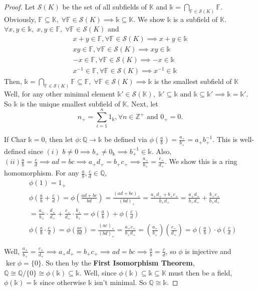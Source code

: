 \documentclass[addpoints,10pt]{exam}
\theoremstyle{plain}
\theoremstyle{definition}
\theoremstyle{plain}
\theoremstyle{plain}
\theoremstyle{definition}
\newcommand{\FF}{\ensuremath{\mathbb{F}}}
\newcommand{\KK}{\ensuremath{\mathbb{K}}}
\newcommand{\QQ}{\ensuremath{\mathbb{Q}}}
\newcommand{\ZZ}{\ensuremath{\mathbb{Z}}}
\newcommand{\kk}{\ensuremath{\mathds{k}}}
\newcommand{\Ss}{\ensuremath{\mathcal{S}}}
\newcommand{\Char}[1]{\mathrm{Char}\; #1}
\begin{document}
\begin{proof}
    Let $\Ss(K)$ be the set of all subfields of $\KK$ and $\kk=\bigcap_{\FF\in \Ss(K)}\FF$. Obviously, $\FF\subseteq \KK,\;\forall \FF\in \Ss(K)\implies \kk\subseteq \KK$. We show $\kk$ is a subfield of $\KK$. $\forall x,y\in \kk,\; x,y\in \FF,\;\forall \FF\in \Ss(K)$ and
    \begin{align*}
        x+y\in \FF,\forall \FF\in \Ss(K)\implies x+y\in \kk\\
        xy\in \FF,\forall \FF\in \Ss(K)\implies xy\in \kk\\
        -x\in \FF,\forall \FF\in \Ss(K)\implies -x\in \kk\\
        x^{-1}\in \FF,\forall \FF\in \Ss(K)\implies x^{-1}\in \kk
    \end{align*}
    Then, $\kk=\bigcap_{\FF\in \Ss(K)}\FF\subseteq \FF,\;\forall \FF\in \Ss(K)\implies \kk$ is the smallest subfield of $\KK$ Well, for any other minimal element $\kk'\in \Ss(\KK),$ $\kk'\subseteq \kk\text{ and }\kk\subseteq \kk'\implies \kk=\kk'$. So $\kk$ is the unique smallest subfield of $\KK$. Next, let 
    $$n_{+}=\sum_{i=1}^{n}1_{\kk},\forall n\in \ZZ^{+}\text{ and }0_{+}=0.$$ 

    If $\Char{\kk}=0$, then let $\phi:\QQ\to \kk$ be defined via
    $\phi(\frac{a}{b})=\frac{a_{+}}{b_{+}}=a_{+}b_{+}^{-1}.$ This is well-defined since $(i)$ $b\neq 0\implies b_{+}\neq 0_{\kk}\implies b_{+}^{-1}\in \kk$. Also, $(ii) \frac{a}{b}=\frac{c}{d}\implies ad=bc\implies a_{+}d_{+}=b_{+}c_{+}\implies \frac{a_{+}}{b_{+}}=\frac{c_{+}}{d_{+}}$. We show this is a ring homomorphism. For any $\frac{a}{b},\frac{c}{d}\in \QQ$,
    \begin{align*}
        &\phi(1)=1_{+}\\
        &\phi(\frac{a}{b}+\frac{c}{d})=\phi(\frac{ad+bc}{bd})=\frac{(ad+bc)_{+}}{(bd)_{+}}=\frac{a_{+}d_{+}+b_{+}c_{+}}{b_{+}d_{+}}=\frac{a_{+}d_{+}}{b_{+}d_{+}}+\frac{b_{+}c_{+}}{b_{+}d_{+}}\\
        &=\frac{a_{+}}{b_{+}}\cdot \frac{d_{+}}{d_{+}}+\frac{c_{+}}{d_{+}}\cdot \frac{b_{+}}{b_{+}}=\phi(\frac{a}{b})+\phi(\frac{c}{d})\\
        &\phi(\frac{a}{b}\cdot \frac{c}{d})=\phi(\frac{ac}{bd})=\frac{(ac)_{+}}{(bd)_{+}}=\frac{a_{+}c_{+}}{b_{+}d_{+}}=(\frac{a_{+}}{b_{+}})(\frac{c_{+}}{d_{+}})=\phi(\frac{a}{b})\cdot \phi(\frac{c}{d})
    \end{align*}
    
    Well, $\frac{a_{+}}{b_{+}}=\frac{c_{+}}{d_{+}}\implies a_{+}d_{+}=b_{+}c_{+}\implies ad=bc\implies \frac{a}{b}=\frac{c}{d}$, so $\phi$ is injective and $\ker \phi=\{0\}$. So then by the \textbf{First Isomorphism Theorem}, $\QQ\cong \QQ/\{0\}\cong \phi(\kk)\subseteq \kk.$ Well, since $\phi(\kk)\subseteq \kk\subseteq \KK$ must then be a field, $\phi(\kk)=\kk$ since otherwise $\kk$ isn't minimal. So $\QQ\cong \kk$.


\end{proof}
\end{document}
